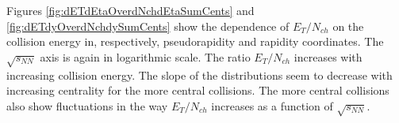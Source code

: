 Figures \ref{fig:dETdEtaOverdNchdEtaSumCents} and \ref{fig:dETdyOverdNchdySumCents} show the dependence of $E_{T}/N_{ch}$ on the collision energy in, respectively, pseudorapidity and rapidity coordinates. The $\sqrt{s_{NN}}$ axis is again in logarithmic scale. The ratio $E_{T}/N_{ch}$ increases with increasing collision energy. The slope of the distributions seem to decrease with increasing centrality for the more central collisions.	The more central collisions also show fluctuations in the way $E_{T}/N_{ch}$ increases as a function of $\sqrt{s_{NN}}$.
	
